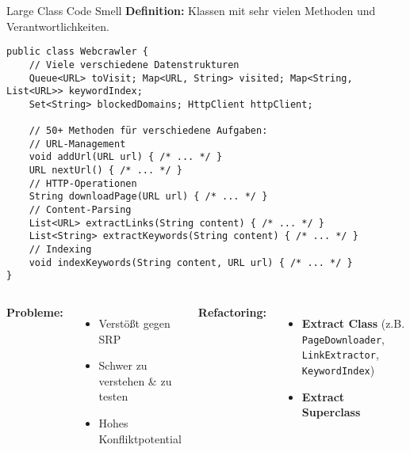 \begin{frame}[fragile]{Large Class Code Smell}
  \textbf{Definition:} Klassen mit sehr vielen Methoden und Verantwortlichkeiten.
  \begin{lstlisting}[style=java, basicstyle=\tiny\ttfamily]
public class Webcrawler {
    // Viele verschiedene Datenstrukturen
    Queue<URL> toVisit; Map<URL, String> visited; Map<String, List<URL>> keywordIndex;
    Set<String> blockedDomains; HttpClient httpClient;

    // 50+ Methoden für verschiedene Aufgaben:
    // URL-Management
    void addUrl(URL url) { /* ... */ }
    URL nextUrl() { /* ... */ }
    // HTTP-Operationen
    String downloadPage(URL url) { /* ... */ }
    // Content-Parsing
    List<URL> extractLinks(String content) { /* ... */ }
    List<String> extractKeywords(String content) { /* ... */ }
    // Indexing
    void indexKeywords(String content, URL url) { /* ... */ }
}
  \end{lstlisting}
  \begin{columns}[T]
    \textbf{Probleme:}
    \begin{itemize}
      \item Verstößt gegen SRP
      \item Schwer zu verstehen \& zu testen
      \item Hohes Konfliktpotential
    \end{itemize}
    \textbf{Refactoring:}
    \begin{itemize}
      \item \textbf{Extract Class} (z.B. \texttt{PageDownloader}, \texttt{LinkExtractor}, \texttt{KeywordIndex})
      \item \textbf{Extract Superclass}
    \end{itemize}
  \end{columns}
\end{frame}

